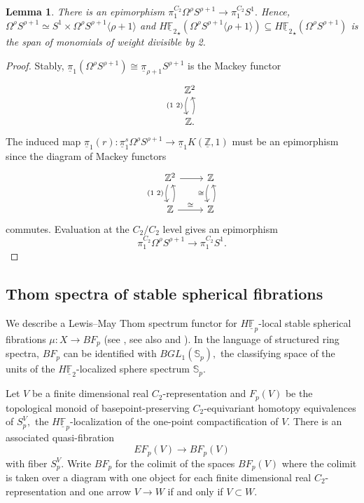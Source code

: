 \documentclass[]{amsart}  %
\newtheorem{lemma}[equation]{Lemma}
\theoremstyle{definition}
\numberwithin{equation}{section}
\numberwithin{figure}{section}
\newcommand{\mF}{{\mathbb F}}
\newcommand{\mS}{{\mathbb S}}
\newcommand{\mZ}{{\mathbb Z}}
\newcommand{\umF}{\underline{\mF}}
\newcommand{\umZ}{\underline{\mZ}}
\newcommand{\upi}{\underline{\pi}}
\newcommand{\0}{\langle 0 \rangle}
\begin{document}
 \begin{lemma}
     \label{claim:wtTwoDiv}
     There is an epimorphism $\pi_{1}^{C_2} \Omega^\rho S^{\rho + 1} \to \pi_1^{C_2} S^1.$ Hence, $\Omega^\rho S^{\rho + 1} \simeq S^1 \times \Omega^\rho S^{\rho + 1} \langle \rho + 1 \rangle$ and $H {\umF_2}_\star (\Omega^\rho S^{\rho + 1} \langle \rho + 1 \rangle ) \subseteq H {\umF_2}_\star (\Omega^\rho S^{\rho + 1})$ is the span of monomials of weight divisible by 2. 
 \end{lemma}
\begin{proof}
	Stably, $\upi_{1} (\Omega^\rho S^{\rho + 1}) \cong \upi_{\rho + 1} S^{\rho + 1}$ is the Mackey functor 
	\[
	\begin{tikzcd}
		\mZ^2 \arrow[d,bend right =20,swap,"(1 \, \,  2)"]   \\
		\mZ \arrow[u, bend right=20].{} 
	\end{tikzcd}
	\] The induced map $\upi_1(r) : \upi^s_1 \Omega^\rho S^{\rho + 1} \to \upi_1 K(\umZ, 1)$ must be an epimorphism since the diagram of Mackey functors
	\[
	\begin{tikzcd}
		\mZ^2 \arrow[d,bend right = 20,swap,"(1 \, \, 2)"] \arrow[r] & \mZ \arrow[d, bend right = 20, swap, "\cong"]  \\
		\mZ \arrow[u, bend right = 20]{} \arrow[r, "\cong"] &  \mZ \arrow[u, bend right = 20] 
	\end{tikzcd}\] 
commutes. Evaluation at the $C_2 / C_2$ level gives an epimorphism 
$$\pi_1^{C_2} \Omega^\rho S^{\rho + 1} \to \pi_1^{C_2} S^1.$$ 
  \end{proof}

\subsection{Thom spectra of stable spherical fibrations} 
We describe a Lewis--May Thom spectrum functor for $H\umF_p$-local stable spherical fibrations $\mu: X \to BF_p$ (see \cite{LewMayStein86}, see also \cite[]{HW2020} and \cite[]{BlubCohSchli2010}). In the language of structured ring spectra, $BF_p$ can be identified with $BGL_1(\mS_p),$ the classifying space of the units of the $H \umF_2$-localized sphere spectrum $\mS_p.$

Let $V$ be a finite dimensional real $C_2$-representation and $F_p(V)$ be the topological monoid of basepoint-preserving $C_2$-equivariant homotopy equivalences of $S^V_p,$ the $H\umF _p$-localization of the one-point compactification of $V.$ There is an associated quasi-fibration
$$ EF_p(V) \to BF_p(V)$$
with fiber $S^V_p.$ Write $BF_p$ for the colimit of the spaces $BF_p(V)$ where the colimit is taken over a diagram with one object for each finite dimensional real $C_2$-representation and one arrow $V \to W$ if and only if $V \subset W.$
\end{document}

